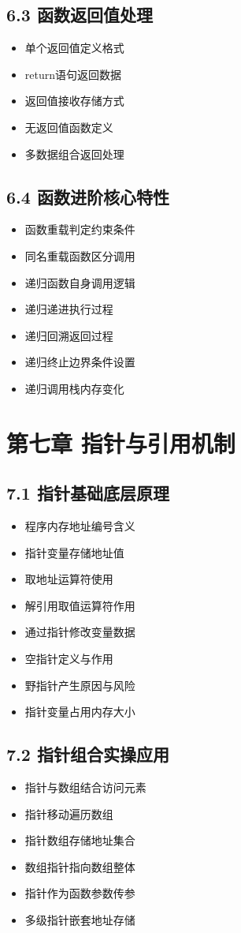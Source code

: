 \subsection{6.3 函数返回值处理}
\begin{itemize}
\item 单个返回值定义格式
\item return语句返回数据
\item 返回值接收存储方式
\item 无返回值函数定义
\item 多数据组合返回处理
\end{itemize}

\subsection{6.4 函数进阶核心特性}
\begin{itemize}
\item 函数重载判定约束条件
\item 同名重载函数区分调用
\item 递归函数自身调用逻辑
\item 递归递进执行过程
\item 递归回溯返回过程
\item 递归终止边界条件设置
\item 递归调用栈内存变化
\end{itemize}

\section{第七章 指针与引用机制}
\subsection{7.1 指针基础底层原理}
\begin{itemize}
\item 程序内存地址编号含义
\item 指针变量存储地址值
\item 取地址运算符使用
\item 解引用取值运算符作用
\item 通过指针修改变量数据
\item 空指针定义与作用
\item 野指针产生原因与风险
\item 指针变量占用内存大小
\end{itemize}

\subsection{7.2 指针组合实操应用}
\begin{itemize}
\item 指针与数组结合访问元素
\item 指针移动遍历数组
\item 指针数组存储地址集合
\item 数组指针指向数组整体
\item 指针作为函数参数传参
\item 多级指针嵌套地址存储
\end{itemize}

